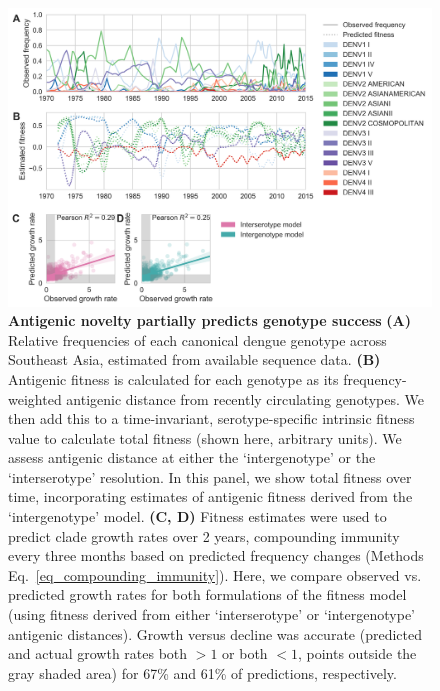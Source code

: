 \documentclass[11pt,oneside,letterpaper]{article}
\begin{document}
\begin{figure}[ht]
  \begin{centering}
\includegraphics[width=\linewidth]{../figures/png/genotype-fitness.png}
    \caption{\textbf{Antigenic novelty partially predicts genotype success }
    \textbf{(A)} Relative frequencies of each canonical dengue genotype across Southeast Asia, estimated from available sequence data.
    \textbf{(B)} Antigenic fitness is calculated for each genotype as its frequency-weighted antigenic distance from recently circulating genotypes.
    We then add this to a time-invariant, serotype-specific intrinsic fitness value to calculate total fitness (shown here, arbitrary units).
    We assess antigenic distance at either the `intergenotype' or the `interserotype' resolution.
    In this panel, we show total fitness over time, incorporating estimates of antigenic fitness derived from the `intergenotype' model.
    \textbf{(C, D)}  Fitness estimates were used to predict clade growth rates over 2 years, compounding immunity every three months based on predicted frequency changes (Methods Eq.~\ref{eq_compounding_immunity}).
    Here, we compare observed vs. predicted growth rates for both formulations of the fitness model (using fitness derived from either `interserotype' or `intergenotype' antigenic distances).
    Growth versus decline was accurate (predicted and actual growth rates both $> 1$ or both $< 1$, points outside the gray shaded area) for 67\% and 61\% of predictions, respectively.
}
     \label{genotype_fitness}
   \end{centering}
\end{figure}

\pagebreak
\end{document}
